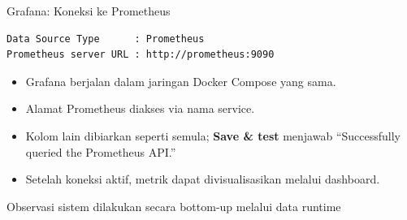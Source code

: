 \documentclass[aspectratio=169, table]{beamer}
\begin{document}
\begin{frame}[fragile]{Grafana: Koneksi ke Prometheus}
	\vspace{20pt}
	\begin{lstlisting}[language=bash,basicstyle=\ttfamily\scriptsize]
Data Source Type      : Prometheus
Prometheus server URL : http://prometheus:9090
\end{lstlisting}

	\vspace{6pt}
	\begin{itemize}
		\item Grafana berjalan dalam jaringan Docker Compose yang sama.
		\item Alamat Prometheus diakses via nama service.
		\item Kolom lain dibiarkan seperti semula; \textbf{Save \& test} menjawab ``Successfully queried the Prometheus API.''
		\item Setelah koneksi aktif, metrik dapat divisualisasikan melalui dashboard.
	\end{itemize}
	
	\vspace{4pt}
	{\footnotesize Observasi sistem dilakukan secara bottom-up melalui data runtime}
\end{frame}
\end{document}
